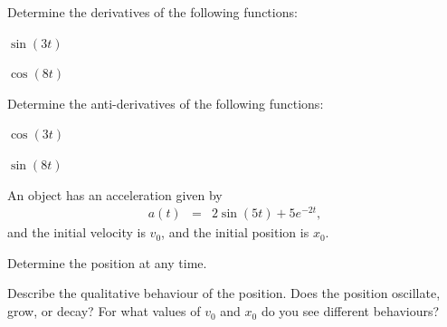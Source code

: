 
\begin{problem}
\item Determine the derivatives of the following functions:
  \begin{subproblem}
  \item $\sin(3t)$
    \vfill
  \item $\cos(8t)$
    \vfill
  \end{subproblem}
\item Determine the anti-derivatives of the following functions:
  \begin{subproblem}
  \item $\cos(3t)$
    \vfill
  \item $\sin(8t)$
    \vfill
  \end{subproblem}

\clearpage

\item An object has an acceleration given by
  \begin{eqnarray*}
    a(t) & = & 2\sin(5t) + 5e^{-2t},
  \end{eqnarray*}
  and the initial velocity is $v_0$, and the initial position is $x_0$.
  \begin{subproblem}
  \item Determine the position at any time.
    \vfill
  \item Describe the qualitative behaviour of the position. Does the position
    oscillate, grow, or decay? For what values of $v_0$ and $x_0$ do
    you see different behaviours?
    \vfill
  \end{subproblem}

\end{problem}


